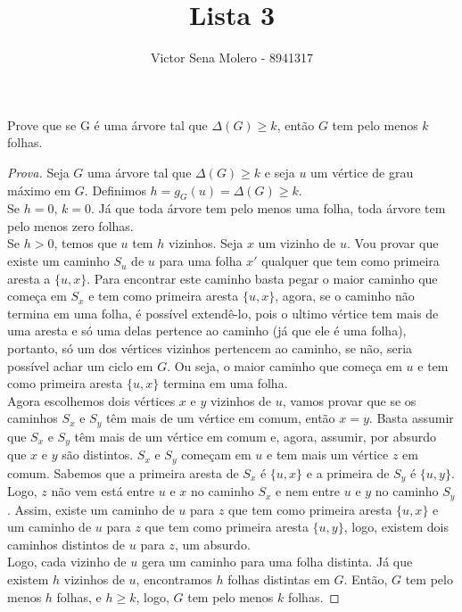 \documentclass[12pt]{article}
\newenvironment{problem}[2][Ex]{\begin{trivlist}
\item[\hskip \labelsep {\bfseries #1}\hskip \labelsep {\bfseries #2.}]}{\end{trivlist}}
\begin{document}
 
 
\title{Lista 3}
\author{Victor Sena Molero - 8941317}
\maketitle

\begin{problem}{11}
Prove que se G é uma árvore tal que $\Delta(G) \geq k$, então $G$ tem pelo menos $k$ folhas.
\end{problem}

\begin{proof}[Prova]
Seja $G$ uma árvore tal que $\Delta(G) \geq k$ e seja $u$ um vértice de grau máximo em $G$. Definimos $h = g_G(u) = \Delta(G) \geq k$. \\
Se $h = 0$, $k = 0$. Já que toda árvore tem pelo menos uma folha, toda árvore tem pelo menos zero folhas. \\
Se $h > 0$, temos que $u$ tem $h$ vizinhos. Seja $x$ um vizinho de $u$. Vou provar que existe um caminho $S_u$ de $u$ para uma folha $x'$ qualquer que tem como primeira aresta a $\{u, x\}$. Para encontrar este caminho basta pegar o maior caminho que começa em $S_x$ e tem como primeira aresta $\{u, x\}$, agora, se o caminho não termina em uma folha, é possível extendê-lo, pois o ultimo vértice tem mais de uma aresta e só uma delas pertence ao caminho (já que ele é uma folha), portanto, só um dos vértices vizinhos pertencem ao caminho, se não, seria possível achar um ciclo em $G$. Ou seja, o maior caminho que começa em $u$ e tem como primeira aresta $\{u, x\}$ termina em uma folha. \\
Agora escolhemos dois vértices $x$ e $y$ vizinhos de $u$, vamos provar que se os caminhos $S_x$ e $S_y$ têm mais de um vértice em comum, então $x = y$. Basta assumir que $S_x$ e $S_y$ têm mais de um vértice em comum e, agora, assumir, por absurdo que $x$ e $y$ são distintos. $S_x$ e $S_y$ começam em $u$ e tem mais um vértice $z$ em comum. Sabemos que a primeira aresta de $S_x$ é $\{u,x\}$ e a primeira de $S_y$ é $\{u,y\}$. Logo, $z$ não vem está entre $u$ e $x$ no caminho $S_x$ e nem entre $u$ e $y$ no caminho $S_y$. Assim, existe um caminho de $u$ para $z$ que tem como primeira aresta $\{u,x\}$ e um caminho de $u$ para $z$ que tem como primeira aresta $\{u,y\}$, logo, existem dois caminhos distintos de $u$ para $z$, um absurdo. \\
Logo, cada vizinho de $u$ gera um caminho para uma folha distinta. Já que existem $h$ vizinhos de $u$, encontramos $h$ folhas distintas em $G$. Então, $G$ tem pelo menos $h$ folhas, e $h \geq k$, logo, $G$ tem pelo menos $k$ folhas.
\end{proof}
\end{document}
